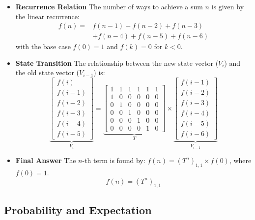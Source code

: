 \begin{itemize}
          \begin{itemize}
              \item \textbf{Recurrence Relation}
                    The number of ways to achieve a sum $n$ is given by the linear recurrence:
                    \begin{equation*}
                        \begin{aligned}
                            f(n) = & f(n-1) + f(n-2) + f(n-3)   \\
                                   & + f(n-4) + f(n-5) + f(n-6)
                        \end{aligned}
                    \end{equation*}
                    with the base case $f(0)=1$ and $f(k)=0$ for $k<0$.

              \item \textbf{State Transition}
                    The relationship between the new state vector ($V_i$) and the old state vector ($V_{i-1}$) is:
                    $$
                        \underbrace{\begin{bmatrix} f(i) \\ f(i-1) \\ f(i-2) \\ f(i-3) \\ f(i-4) \\ f(i-5) \end{bmatrix}}_{V_{i}} =
                        \underbrace{\begin{bmatrix}
                                1 & 1 & 1 & 1 & 1 & 1 \\
                                1 & 0 & 0 & 0 & 0 & 0 \\
                                0 & 1 & 0 & 0 & 0 & 0 \\
                                0 & 0 & 1 & 0 & 0 & 0 \\
                                0 & 0 & 0 & 1 & 0 & 0 \\
                                0 & 0 & 0 & 0 & 1 & 0
                            \end{bmatrix}}_{T}
                        \times
                        \underbrace{\begin{bmatrix} f(i-1) \\ f(i-2) \\ f(i-3) \\ f(i-4) \\ f(i-5) \\ f(i-6) \end{bmatrix}}_{V_{i-1}}
                    $$

              \item \textbf{Final Answer}
                    The $n$-th term is found by: $f(n) = (T^n)_{1,1} \times f(0)$, where $f(0)=1$.
                    $$f(n) = (T^n)_{1,1}$$
          \end{itemize}

\end{itemize}

\subsection{Probability and Expectation}
